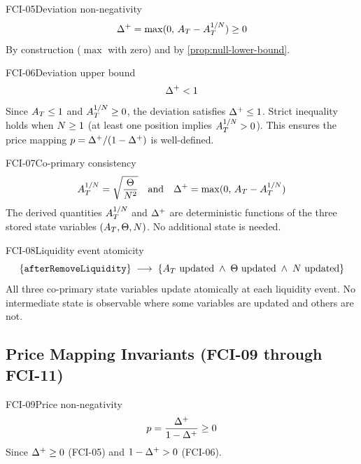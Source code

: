 \begin{invariant}{FCI-05}{Deviation non-negativity}
\[
  \Delta^{+} = \max(0,\, A_T - A_T^{1/N}) \geq 0
\]
By construction ($\max$ with zero) and by \cref{prop:null-lower-bound}.
\end{invariant}

\begin{invariant}{FCI-06}{Deviation upper bound}
\[
  \Delta^{+} < 1
\]
Since $A_T \leq 1$ and $A_T^{1/N} \geq 0$, the deviation satisfies $\Delta^{+} \leq 1$.
Strict inequality holds when $N \geq 1$ (at least one position implies $A_T^{1/N} > 0$).
This ensures the price mapping $p = \Delta^{+}/(1-\Delta^{+})$ is well-defined.
\end{invariant}

\begin{invariant}{FCI-07}{Co-primary consistency}
\[
  A_T^{1/N} = \sqrt{\frac{\Theta}{N^2}}
  \quad\text{and}\quad
  \Delta^{+} = \max(0,\, A_T - A_T^{1/N})
\]
The derived quantities $A_T^{1/N}$ and $\Delta^{+}$ are deterministic functions of
the three stored state variables $(A_T, \Theta, N)$.
No additional state is needed.
\end{invariant}

\begin{invariant}{FCI-08}{Liquidity event atomicity}
\[
  \{\texttt{afterRemoveLiquidity}\}
  \;\longrightarrow\;
  \{A_T \text{ updated} \;\land\; \Theta \text{ updated} \;\land\; N \text{ updated}\}
\]
All three co-primary state variables update atomically at each liquidity event.
No intermediate state is observable where some variables are updated and others are not.
\end{invariant}

\subsection{Price Mapping Invariants (FCI-09 through FCI-11)}

\begin{invariant}{FCI-09}{Price non-negativity}
\[
  p = \frac{\Delta^{+}}{1 - \Delta^{+}} \geq 0
\]
Since $\Delta^{+} \geq 0$ (FCI-05) and $1 - \Delta^{+} > 0$ (FCI-06).
\end{invariant}

